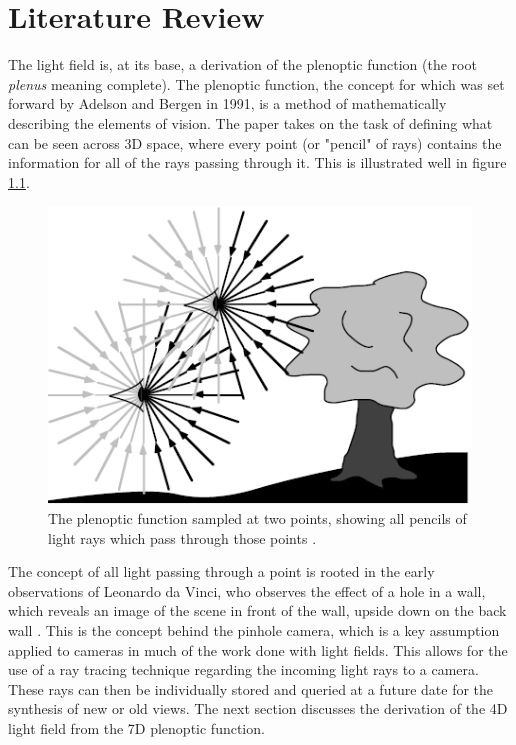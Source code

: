 \documentclass[12pt]{report}
\begin{document}
\chapter{Literature Review}
The light field is, at its base, a derivation of the plenoptic function (the root \emph{plenus} meaning complete). The plenoptic function, the concept for which was set forward by Adelson and Bergen in 1991, is a method of mathematically describing the elements of vision. The paper takes on the task of defining what can be seen across 3D space, where every point (or "pencil" of rays) contains the information for all of the rays passing through it. This is illustrated well in figure \ref{fig:plenoptic_visual}. 
\begin{figure}[!ht]
	\centering
	\includegraphics[scale=0.75]{plenoptic_image.png}
	\caption{The plenoptic function sampled at two points, showing all pencils of light rays which pass through those points \cite{Adelson91}.}
	\label{fig:plenoptic_visual}
\end{figure}
The concept of all light passing through a point is rooted in the early observations of Leonardo da Vinci, who observes the effect of a hole in a wall, which reveals an image of the scene in front of the wall, upside down on the back wall \cite{Adelson91}. This is the concept behind the pinhole camera, which is a key assumption applied to cameras in much of the work done with light fields. This allows for the use of a ray tracing technique regarding the incoming light rays to a camera. These rays can then be individually stored and queried at a future date for the synthesis of new or old views. The next section discusses the derivation of the 4D light field from the 7D plenoptic function.  
\end{document}

